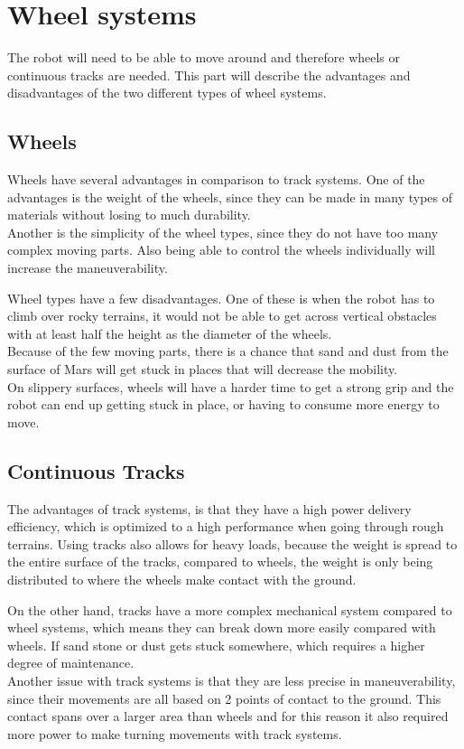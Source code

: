 \section{Wheel systems}
The robot will need to be able to move around and therefore wheels or continuous tracks are needed. This part will describe the advantages and disadvantages of the two different types of wheel systems.


\subsection{Wheels}\label{ch:Wheels}
Wheels have several advantages in comparison to track systems. One of the advantages is the weight of the wheels, since they can be made in many types of materials without losing to much durability.\\
Another is the simplicity of the wheel types, since they do not have too many complex moving parts.
Also being able to control the wheels individually will increase the maneuverability.

Wheel types have a few disadvantages. One of these is when the robot has to climb over rocky terrains, it would not be able to get across vertical obstacles with at least half the height as the diameter of the wheels.\\ Because of the few moving parts, there is a chance that sand and dust from the surface of Mars will get stuck in places that will decrease the mobility.\\ On slippery surfaces, wheels will have a harder time to get a strong grip and the robot can end up getting stuck in place, or having to consume more energy to move\cite{Wheels1}\cite{Wheels2}.
\subsection{Continuous Tracks}
The advantages of track systems, is that they have a high power delivery efficiency, which is optimized to a high performance when going through rough terrains.
Using tracks also allows for heavy loads, because the weight is spread to the entire surface of the tracks, compared to wheels, the weight is only being distributed to where the wheels make contact with the ground.

On the other hand, tracks have a more complex mechanical system compared to wheel systems, which means they can break down more easily compared with wheels. If sand stone or dust gets stuck somewhere, which requires a higher degree of maintenance.\\
Another issue with track systems is that they are less precise in maneuverability, since their movements are all based on 2 points of contact to the ground. This contact spans over a larger area than wheels and for this reason it also required more power to make turning movements with track systems\cite{Wheels1}\cite{Wheels2}.


